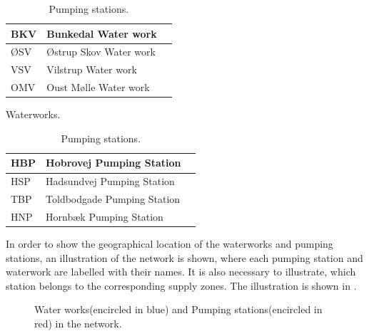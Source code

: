 \begin{table}[!htp]
\begin{subtable}{.52\linewidth}
\begin{center}
    \begin{tabular}{| l | l | l |}
    \hline
    BKV & Bunkedal Water work   \\ \hline
    ØSV & Østrup Skov Water work  \\ \hline
    VSV & Vilstrup Water work  \\ \hline
    OMV & Oust Mølle Water work   \\
    \hline
    \end{tabular}
\end{center}
\vspace{-3mm}
\caption{Waterworks.}
\label{waterworks_tab}
\end{subtable}
\begin{subtable}{.4\linewidth}
\begin{center}
    \begin{tabular}{| l | l | l |}
    \hline
    HBP & Hobrovej Pumping Station   \\ \hline
    HSP & Hadsundvej Pumping Station  \\ \hline
    TBP & Toldbodgade Pumping Station  \\ \hline
    HNP & Hornbæk Pumping Station   \\
    \hline
    \end{tabular}
    \end{center}
\vspace{-3mm}
\caption{Pumping stations.}
\label{pumpingstations_tab}
\end{subtable}
\end{table}
\vspace{-3mm}

In order to show the geographical location of the waterworks and pumping stations, an illustration of the network is shown, where each pumping station and waterwork are labelled with their names. It is also necessary to illustrate, which station belongs to the corresponding supply zones. The illustration is shown in .

\vspace{-5mm}

\begin{figure}[H]
\centering
 
\caption{Water works(encircled in blue) and Pumping stations(encircled in red) in the network.}
\vspace{-3mm}
\label{fig:pumping_stations_and_waterworks}
\end{figure}

